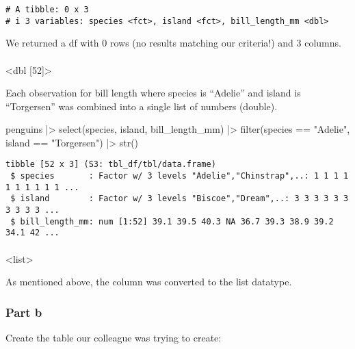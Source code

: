 \documentclass[
  letterpaper,
  DIV=11,
  numbers=noendperiod]{scrartcl}
\makeatletter
\let\oldparagraph\paragraph
\renewcommand{\paragraph}{
    \@ifstar
      \xxxParagraphStar
      \xxxParagraphNoStar
  }
\newcommand{\xxxParagraphStar}[1]{\oldparagraph*{#1}\mbox{}}
\newcommand{\xxxParagraphNoStar}[1]{\oldparagraph{#1}\mbox{}}
\newenvironment{Shaded}{\begin{snugshade}}{\end{snugshade}}
\newcommand{\FunctionTok}[1]{\textcolor[rgb]{0.28,0.35,0.67}{#1}}
\newcommand{\NormalTok}[1]{\textcolor[rgb]{0.00,0.23,0.31}{#1}}
\newcommand{\SpecialCharTok}[1]{\textcolor[rgb]{0.37,0.37,0.37}{#1}}
\newcommand{\StringTok}[1]{\textcolor[rgb]{0.13,0.47,0.30}{#1}}
\makeatother
\begin{document}
\begin{verbatim}
# A tibble: 0 x 3
# i 3 variables: species <fct>, island <fct>, bill_length_mm <dbl>
\end{verbatim}

We returned a df with 0 rows (no results matching our criteria!) and 3
columns.

\paragraph{\textless dbl {[}52{]}\textgreater{}}\label{dbl-52}

Each observation for bill length where species is ``Adelie'' and island
is ``Torgersen'' was combined into a single list of numbers (double).

\begin{Shaded}
\begin{Highlighting}[]
\NormalTok{penguins }\SpecialCharTok{|\textgreater{}} \FunctionTok{select}\NormalTok{(species, island, bill\_length\_mm) }\SpecialCharTok{|\textgreater{}} \FunctionTok{filter}\NormalTok{(species }\SpecialCharTok{==} \StringTok{"Adelie"}\NormalTok{, island }\SpecialCharTok{==} \StringTok{"Torgersen"}\NormalTok{) }\SpecialCharTok{|\textgreater{}} \FunctionTok{str}\NormalTok{()}
\end{Highlighting}
\end{Shaded}

\begin{verbatim}
tibble [52 x 3] (S3: tbl_df/tbl/data.frame)
 $ species       : Factor w/ 3 levels "Adelie","Chinstrap",..: 1 1 1 1 1 1 1 1 1 1 ...
 $ island        : Factor w/ 3 levels "Biscoe","Dream",..: 3 3 3 3 3 3 3 3 3 3 ...
 $ bill_length_mm: num [1:52] 39.1 39.5 40.3 NA 36.7 39.3 38.9 39.2 34.1 42 ...
\end{verbatim}

\paragraph{\textless list\textgreater{}}\label{list}

As mentioned above, the column was converted to the list datatype.

\subsubsection{Part b}\label{part-b-2}

Create the table our colleague was trying to create:
\end{document}
